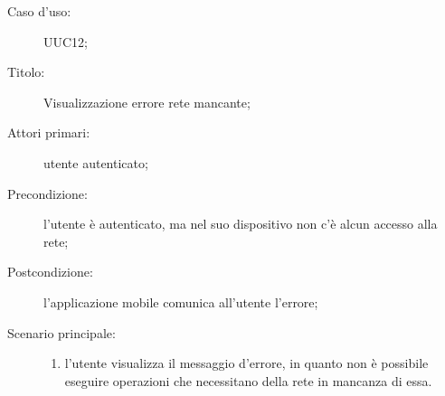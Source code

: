 \documentclass[../../../analisi-dei-requisiti.tex]{subfiles}
\begin{document}
\begin{description}
  \item[Caso d’uso:] UUC12;
  \item[Titolo:] Visualizzazione errore rete mancante;
  \item[Attori primari:] utente autenticato;
  \item[Precondizione:] l'utente è autenticato, ma nel suo dispositivo non c'è alcun accesso alla rete;
  \item[Postcondizione:] l'applicazione mobile comunica all'utente l'errore;
  \item[Scenario principale:]
        \begin{enumerate}
          \item l'utente visualizza il messaggio d'errore, in quanto non è possibile eseguire operazioni che necessitano della rete in mancanza di essa.
        \end{enumerate}
\end{description}
\end{document}
